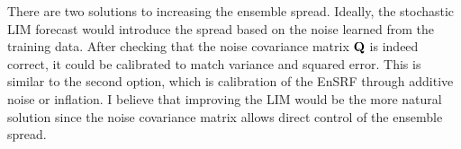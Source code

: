 \documentclass[parskip=half,DIV=16]{scrartcl}
\begin{document}
There are two solutions to increasing the ensemble spread. Ideally, the stochastic LIM forecast would introduce the spread based on the noise learned from the training data. After checking that the noise covariance matrix $\vb{Q}$ is indeed correct, it could be calibrated to match variance and squared error. This is similar to the second option, which is calibration of the \gls{EnSRF} through additive noise or inflation. I believe that improving the LIM would be the more natural solution since the noise covariance matrix allows direct control of the ensemble spread.




\printbibliography
\end{document}
